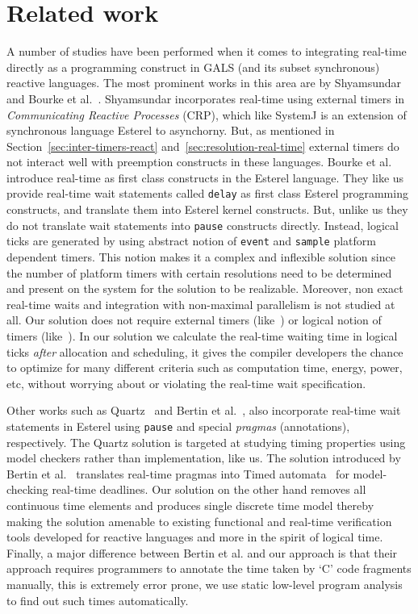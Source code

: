 \section{Related work}
\label{sec:related-work}


A number of studies have been performed when it comes to integrating
real-time directly as a programming construct in GALS (and its subset
synchronous) reactive languages. The most prominent works in this area
are by Shyamsundar~\cite{rsh94} and Bourke et
al.~\cite{Bourke2009a}. Shyamsundar incorporates real-time using
external timers in \textit{Communicating Reactive Processes} (CRP),
which like SystemJ is an extension of synchronous language Esterel to
asynchorny. But, as mentioned in Section~\ref{sec:inter-timers-react}
and~\ref{sec:resolution-real-time} external timers do not interact well
with preemption constructs in these languages. Bourke et al. introduce
real-time as first class constructs in the Esterel language. They like
us provide real-time wait statements called \texttt{delay} as first
class Esterel programming constructs, and translate them into Esterel
kernel constructs. But, unlike us they do not translate wait statements
into \texttt{pause} constructs directly. Instead, logical ticks are
generated by using abstract notion of \texttt{event} and \texttt{sample}
platform dependent timers. This notion makes it a complex and inflexible
solution since the number of platform timers with certain resolutions
need to be determined and present on the system for the solution to be
realizable. Moreover, non exact real-time waits and integration with
non-maximal parallelism is not studied at all. Our solution does not
require external timers (like~\cite{rsh94}) or logical notion of timers
(like~\cite{Bourke2009a}). In our solution we calculate the real-time
waiting time in logical ticks \textit{after} allocation and scheduling,
it gives the compiler developers the chance to optimize for many
different criteria such as computation time, energy, power, etc, without
worrying about or violating the real-time wait specification.

Other works such as Quartz~\cite{glog02} and Bertin et
al.~\cite{Bertin:2000:TVR:1947412.1947439}, also incorporate real-time
wait statements in Esterel using \texttt{pause} and special
\textit{pragmas} (annotations), respectively.  The Quartz solution is
targeted at studying timing properties using model checkers rather than
implementation, like us. The solution introduced by Bertin et
al.~\cite{Bertin:2000:TVR:1947412.1947439} translates real-time pragmas
into Timed automata~\cite{alur94} for model-checking real-time
deadlines. Our solution on the other hand removes all continuous time
elements and produces single discrete time model thereby making the
solution amenable to existing functional and real-time verification
tools developed for reactive languages and more in the spirit of logical
time. Finally, a major difference between Bertin et al. and our approach
is that their approach requires programmers to annotate the time taken
by `C' code fragments manually, this is extremely error prone, we use
static low-level program analysis to find out such times automatically.




